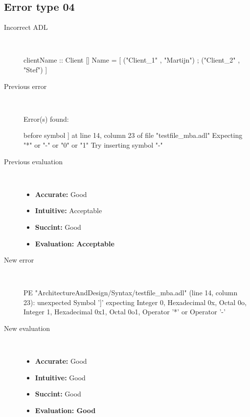 \subsection{Error type 04}
  \begin{description}
  \item[Incorrect ADL]~\\
\begin{adl}
clientName :: Client [] Name =
    [ ("Client_1"      , "Martijn")
    ; ("Client_2"      , "Stef")
    ]\end{adl}
  \item[Previous error]~\\
\begin{haskell}
Error(s) found:

before symbol ] at line 14, column 23 of file "testfile_mba.adl"
Expecting "*" or "-" or "0" or "1"
Try inserting symbol "-"

\end{haskell}
  \item[Previous evaluation]~\\
    \begin{itemize}
    \item \textbf{Accurate:} Good
    \item \textbf{Intuitive:} Acceptable
    \item \textbf{Succint:} Good
    \item \textbf{Evaluation: Acceptable}
    \end{itemize}
  \item[New error]~\\
\begin{haskell}
PE "ArchitectureAndDesign/Syntax/testfile_mba.adl" (line 14, column 23):
unexpected Symbol ']'
expecting Integer 0, Hexadecimal 0x, Octal 0o, Integer 1, Hexadecimal 0x1, Octal 0o1, Operator '*' or Operator '-'\end{haskell}
  \item[New evaluation]~\\
    \begin{itemize}
    \item \textbf{Accurate:} Good
    \item \textbf{Intuitive:} Good
    \item \textbf{Succint:} Good
    \item \textbf{Evaluation: Good
}
    \end{itemize}
  \end{description}

\hrulefill

